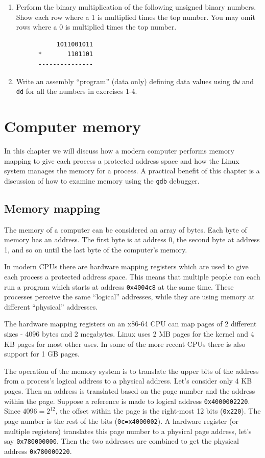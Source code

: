 \documentclass[11pt,b5paper]{book}
\begin{document}
\begin{enumerate}
\item Perform the binary multiplication of the following unsigned binary numbers.  Show each row where a 1 is multiplied times the top number.
You may omit rows where a 0 is multiplied times the top number.

\begin{verbatim}
           1011001011
      *       1101101
      ---------------
\end{verbatim}


\item Write an assembly ``program'' (data only) defining data values using
{\tt dw} and {\tt dd} for all the numbers in exercises 1-4.

\end{enumerate}

\chapter{Computer memory}

In this chapter we will discuss how a modern computer performs memory mapping
to give each process a protected address space and how the Linux system
manages the memory for a process.
A practical benefit of this chapter is a discussion of how to examine memory
using the {\tt gdb} debugger.

\section{Memory mapping}

The memory of a computer can be considered an array of bytes.
Each byte of memory has an address.
The first byte is at address 0, the second byte at address 1, and so on
until the last byte of the computer's memory.

In modern CPUs there are hardware mapping registers which
are used to give each process a protected address space.
This means that multiple people can each run a program which starts at
address {\tt 0x4004c8} at the same time.
These processes perceive the same ``logical'' addresses, while they are
using memory at different ``physical'' addresses.

The hardware mapping registers on an x86-64 CPU can map pages of 2 different
sizes - 4096 bytes and 2 megabytes.
Linux uses 2 MB pages for the kernel and 4 KB pages for most other uses.
In some of the more recent CPUs there is also support for 1 GB pages.

The operation of the memory system is to translate the upper bits of the
address from a process's logical address to a physical address.
Let's consider only 4 KB pages.
Then an address is translated based on the page number and the address
within the page.
Suppose a reference is made to logical address {\tt 0x4000002220}.
Since $4096 = 2^{12}$, the offset within the page is the right-most
12 bits ({\tt 0x220}).
The page number is the rest of the bits ({\tt 0c=x4000002}).
A hardware register (or multiple registers) translates this page number to
a physical page address, let's say {\tt 0x780000000}.
Then the two addresses are combined to get the physical address
{\tt 0x780000220}.
\end{document}

